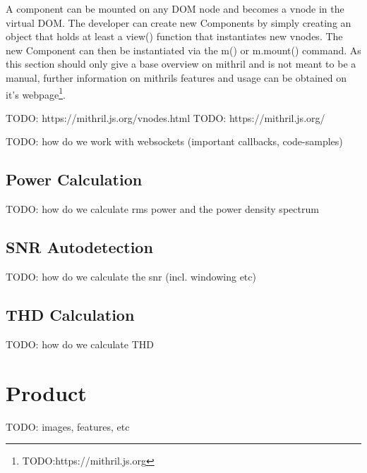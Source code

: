 A component can be mounted on any DOM node and becomes a vnode in the virtual DOM. The developer can create new Components by simply creating an object that holds at least a view() function that instantiates new vnodes.
The new Component can then be instantiated via the m() or m.mount() command.
As this section should only give a base overview on mithril and is not meant to be a manual, further information on mithrils features and usage can be obtained on it's webpage\footnote{TODO:https://mithril.js.org}.

TODO: https://mithril.js.org/vnodes.html
TODO: https://mithril.js.org/

TODO: how do we work with websockets (important callbacks, code-samples)

\subsection{Power Calculation}

TODO: how do we calculate rms power and the power density spectrum

\subsection{SNR Autodetection}

TODO: how do we calculate the snr (incl. windowing etc)

\subsection{THD Calculation}

TODO: how do we calculate THD

\section{Product}

TODO: images, features, etc


